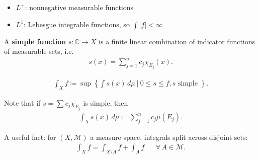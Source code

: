 \begin{remark}[on notation]

\envlist

\begin{itemize}
\tightlist
\item
  \(L^+\): nonnegative measurable functions
\item
  \(L^1\): Lebesgue integrable functions, so
  \(\int {\left\lvert {f} \right\rvert} < \infty\)
\end{itemize}

\end{remark}

\begin{definition}

A \textbf{simple function} \(s: {\mathbb{C}}\to X\) is a finite linear
combination of indicator functions of measurable sets, i.e.~
\begin{align*}
s(x) = \sum_{j=1}^n c_j \chi_{E_j}(x)
.\end{align*}

\end{definition}

\begin{definition}

\begin{align*}
\int_X f \coloneqq\sup \left\{{ \int s(x) \,d\mu{~\mathrel{\Big|}~}0\leq s \leq f, s\text{ simple } }\right\} 
.\end{align*}

Note that if \(s = \sum c_j \chi_{E_j}\) is simple, then
\begin{align*}
\int_X s(x) \,d\mu\coloneqq\sum_{j=1}^n c_j \mu(E_j)
.\end{align*}

\end{definition}

\begin{remark}

A useful fact: for \((X, \mathcal{M})\) a measure space, integrals split
across disjoint sets:
\begin{align*}
\int_X f = \int_{X\setminus A} f + \int_A f && \forall\, A \in \mathcal{M} 
.\end{align*}

\end{remark}

